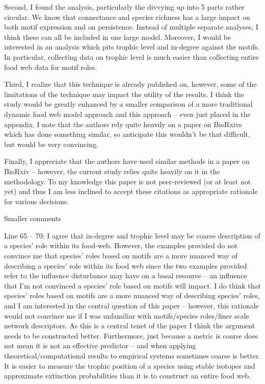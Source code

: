 \documentclass[12pt]{article}
\begin{document}
Second, I found the analysis, particularly the divvying up into 5 parts rather circular. We know that connectance and species richness has a large impact on both motif expression and on persistence. Instead of multiple separate analyses, I think these can all be included in one large model. Moreover, I would be interested in an analysis which pits trophic level and in-degree against the motifs. In particular, collecting data on trophic level is much easier than collecting entire food web data for motif roles.

Third, I realize that this technique is already published on, however, some of the limitations of the technique may impact the utility of the results. I think the study would be greatly enhanced by a smaller comparison of a more traditional dynamic food web model approach and this approach – even just placed in the appendix. I note that the authors rely quite heavily on a paper on BioRxivs which has done something similar, so anticipate this wouldn’t be that difficult, but would be very convincing.

Finally, I appreciate that the authors have used similar methods in a paper on BioRxiv – however, the current study relies quite heavily on it in the methodology. To my knowledge this paper is not peer-reviewed (or at least not yet) and thus I am less inclined to accept these citations as appropriate rationale for various decisions.

Smaller comments

Line 65 – 70: I agree that in-degree and trophic level may be coarse description of a species’ role within its food-web. However, the examples provided do not convince me that species’ roles based on motifs are a more nuanced way of describing a species’ role within its food web since the two examples provided refer to the influence disturbance may have on a basal resource – an influence that I’m not convinced a species’ role based on motifs will impact.  
I do think that species’ roles based on motifs are a more nuanced way of describing species’ roles, and I am interested in the central question of this paper – however, this rationale would not convince me if I was unfamiliar with motifs/species roles/finer scale network descriptors.  As this is a central tenet of the paper I think the argument needs to be constructed better. Furthermore, just because a metric is coarse does not mean it is not an effective predictor – and when applying theoretical/computational results to empirical systems sometimes coarse is better. It is easier to measure the trophic position of a species using stable isotopes and approximate extinction probabilities than it is to construct an entire food web.
\end{document}
